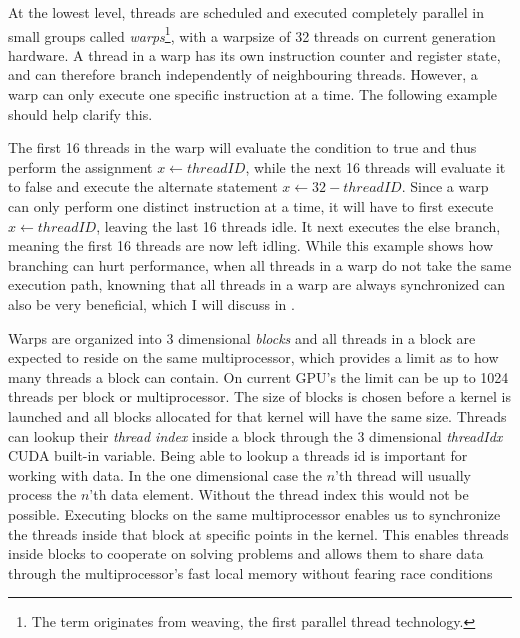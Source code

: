 At the lowest level, threads are scheduled and executed completely parallel in
small groups called \textit{warps}\footnote{The term originates from weaving,
  the first parallel thread technology.}, with a warpsize of 32
threads on current generation hardware. A thread in a warp has its own
instruction counter and register state, and can therefore branch independently
of neighbouring threads. However, a warp can only execute one specific
instruction at a time. The following example should help clarify this.

\begin{algorithmic}
  \ELSE
  \ENDIF
\end{algorithmic}


The first 16 threads in the warp will evaluate the condition to true and thus
perform the assignment $x \leftarrow threadID$, while the next 16 threads will
evaluate it to false and execute the alternate statement $x \leftarrow 32 -
threadID$. Since a warp can only perform one distinct instruction at a time, it
will have to first execute $x \leftarrow threadID$, leaving the last 16 threads
idle. It next executes the else branch, meaning the first 16 threads are now
left idling. While this example shows how branching can hurt performance, when
all threads in a warp do not take the same execution path, knowning that all
threads in a warp are always synchronized can also be very beneficial, which I
will discuss in .



Warps are organized into 3 dimensional \textit{blocks} and all threads in a
block are expected to reside on the same multiprocessor, which provides a limit
as to how many threads a block can contain. On current GPU's the limit can be up
to 1024 threads per block or multiprocessor. The size of blocks is chosen before
a kernel is launched and all blocks allocated for that kernel will have the same
size. Threads can lookup their \textit{thread index} inside a block through the
3 dimensional \textit{threadIdx} CUDA built-in variable. Being able to lookup a
threads id is important for working with data. In the one dimensional case the
$n$'th thread will usually process the $n$'th data element. Without the thread
index this would not be possible. Executing blocks on the same multiprocessor
enables us to synchronize the threads inside that block at specific points in
the kernel. This enables threads inside blocks to cooperate on solving problems
and allows them to share data through the multiprocessor's fast local memory
without fearing race conditions

